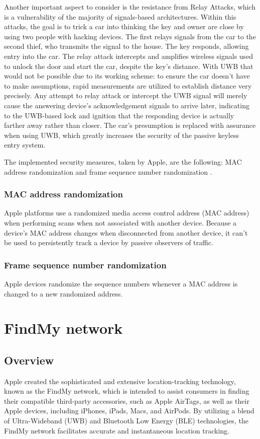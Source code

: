 \documentclass[english]{article}
\begin{document}
Another important aspect to consider is the resistance from Relay Attacks, which is a vulnerability of the majority of signals-based architectures. Within this attacks, the goal is to trick a car into thinking the key and owner are close by using two people with hacking devices. The first relays signals from the car to the second thief, who transmits the signal to the house. The key responds, allowing entry into the car. The relay attack intercepts and amplifies wireless signals used to unlock the door and start the car, despite the key's distance. With UWB that would not be possible due to its working scheme: to ensure the car doesn't have to make assumptions, rapid measurements are utilized to establish distance very precisely. Any attempt to relay attack or intercept the UWB signal will merely cause the answering device's acknowledgement signals to arrive later, indicating to the UWB-based lock and ignition that the responding device is actually farther away rather than closer. The car's presumption is replaced with assurance when using UWB, which greatly increases the security of the passive keyless entry system.

The implemented security measures, taken by Apple, are the following: MAC address randomization and frame sequence number randomization \cite{aps}.

\subsubsection{MAC address randomization}
Apple platforms use a randomized media access control address (MAC address) when performing scans when not associated with another device. Because a device’s MAC address changes when disconnected from another device, it can’t be used to persistently track a device by passive observers of traffic.

\subsubsection{Frame sequence number randomization}
Apple devices randomize the sequence numbers whenever a MAC address is changed to a new randomized address.

\section{FindMy network}\label{sec:find}
\subsection{Overview}
Apple created the sophisticated and extensive location-tracking technology, known as the FindMy network, which is intended to assist consumers in finding their compatible third-party accessories, such as Apple AirTags, as well as their Apple devices, including iPhones, iPads, Macs, and AirPods. By utilizing a blend of Ultra-Wideband (UWB) and Bluetooth Low Energy (BLE) technologies, the FindMy network facilitates accurate and instantaneous location tracking.
\end{document}
